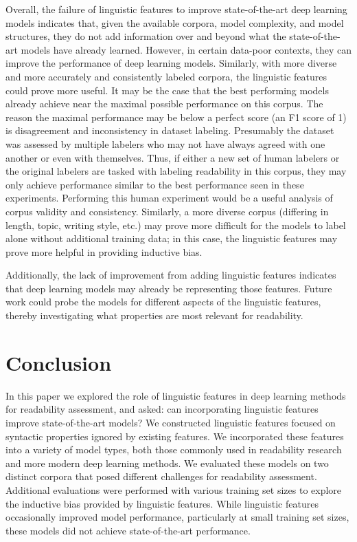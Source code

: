 \documentclass[11pt,a4paper]{article}
\theoremstyle{definition}
\begin{document}
Overall, the failure of linguistic features to improve state-of-the-art deep learning models indicates that, given the available corpora, model complexity, and model structures, they do not add information over and beyond what the state-of-the-art models have already learned. However, in certain data-poor contexts, they can improve the performance of deep learning models. Similarly, with more diverse and more accurately and consistently labeled corpora, the linguistic features could prove more useful. It may be the case that the best performing models already achieve near the maximal possible performance on this corpus. The reason the maximal performance may be below a perfect score (an F1 score of 1) is disagreement and inconsistency in dataset labeling. Presumably the dataset was assessed by multiple labelers who may not have always agreed with one another or even with themselves. Thus, if either a new set of human labelers or the original labelers are tasked with labeling readability in this corpus, they may only achieve performance similar to the best performance seen in these experiments. Performing this human experiment would be a useful analysis of corpus validity and consistency. Similarly, a more diverse corpus (differing in length, topic, writing style, etc.) may prove more difficult for the models to label alone without additional training data; in this case, the linguistic features may prove more helpful in providing inductive bias.

Additionally, the lack of improvement from adding linguistic features indicates that deep learning models may already be representing those features. Future work could probe the models for different aspects of the linguistic features, thereby investigating what properties are most relevant for readability. 
\section{Conclusion}
\label{sec:conclusion}
In this paper we explored the role of linguistic features in deep learning methods for readability assessment, and asked: can incorporating linguistic features improve state-of-the-art models? We constructed linguistic features focused on syntactic properties ignored by existing features. We incorporated these features into a variety of model types, both those commonly used in readability research and more modern deep learning methods. We evaluated these models on two distinct corpora that posed different challenges for readability assessment. Additional evaluations were performed with various training set sizes to explore the inductive bias provided by linguistic features. While linguistic features occasionally improved model performance, particularly at small training set sizes, these models did not achieve state-of-the-art performance.
\end{document}
